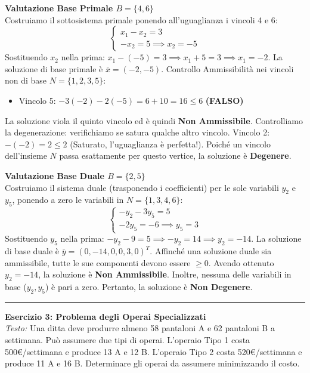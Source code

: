 \documentclass[12pt, a4paper]{article}
\begin{document}
	\textbf{Valutazione Base Primale $B = \{4, 6\}$}\\
	Costruiamo il sottosistema primale ponendo all'uguaglianza i vincoli 4 e 6:
	\[
	\begin{cases}
		x_1 - x_2 = 3 \\
		-x_2 = 5 \implies x_2 = -5
	\end{cases}
	\]
	Sostituendo $x_2$ nella prima: $x_1 - (-5) = 3 \implies x_1 + 5 = 3 \implies x_1 = -2$.
	La soluzione di base primale è $\bar{x} = (-2, -5)$.
	Controllo Ammissibilità nei vincoli non di base $N = \{1, 2, 3, 5\}$:
	\begin{itemize}[label=$\circ$, itemsep=1pt, leftmargin=1.5cm]
		\item Vincolo 5: $-3(-2) - 2(-5) = 6 + 10 = 16 \leq 6$ \textbf{(FALSO)}
	\end{itemize}
	La soluzione viola il quinto vincolo ed è quindi \textbf{Non Ammissibile}.
	Controlliamo la degenerazione: verifichiamo se satura qualche altro vincolo.
	Vincolo 2: $-(-2) = 2 \leq 2$ (Saturato, l'uguaglianza è perfetta!). Poiché un vincolo dell'insieme $N$ passa esattamente per questo vertice, la soluzione è \textbf{Degenere}.
	
	\textbf{Valutazione Base Duale $B = \{2, 5\}$}\\
	Costruiamo il sistema duale (trasponendo i coefficienti) per le sole variabili $y_2$ e $y_5$, ponendo a zero le variabili in $N=\{1,3,4,6\}$:
	\[
	\begin{cases}
		-y_2 - 3y_5 = 5 \\
		-2y_5 = -6 \implies y_5 = 3
	\end{cases}
	\]
	Sostituendo $y_5$ nella prima: $-y_2 - 9 = 5 \implies -y_2 = 14 \implies y_2 = -14$.
	La soluzione di base duale è $\bar{y} = (0, -14, 0, 0, 3, 0)^T$.
	Affinché una soluzione duale sia ammissibile, tutte le sue componenti devono essere $\geq 0$. Avendo ottenuto $y_2 = -14$, la soluzione è \textbf{Non Ammissibile}.
	Inoltre, nessuna delle variabili in base ($y_2, y_5$) è pari a zero. Pertanto, la soluzione è \textbf{Non Degenere}.
	
	\vspace{0.6cm}
	\hrule
	\vspace{0.4cm}
	
	\textbf{Esercizio 3: Problema degli Operai Specializzati}\\
	\textit{Testo:} Una ditta deve produrre almeno 58 pantaloni A e 62 pantaloni B a settimana. Può assumere due tipi di operai. L'operaio Tipo 1 costa 500€/settimana e produce 13 A e 12 B. L'operaio Tipo 2 costa 520€/settimana e produce 11 A e 16 B. Determinare gli operai da assumere minimizzando il costo.
	
\end{document}
